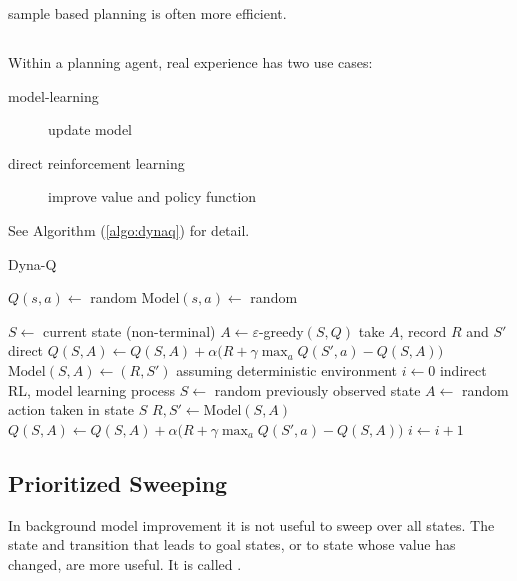 sample based planning is often more efficient.



\subsection{}

Within a planning agent, real experience has two use cases:

\begin{description}
	\item [model-learning] update model
	\item [direct reinforcement learning] improve value and policy function
\end{description}




See Algorithm (\ref{algo:dynaq}) for detail.


\begin{algorithm}
	\caption{Dyna-Q}\label{algo:dynaq}	
	
	\begin{algorithmic}[1]
		\State $Q(s,a) \gets$ random
		\State $\text{Model}(s,a) \gets$ random
		
		\Statex
		
		\Loop
			\State $S \gets$ current state (non-terminal)
			\State $A \gets \varepsilon$-greedy$(S,Q)$
			\State take $A$, record $R$ and $S\prime$
			\State \Comment direct 
			\State $Q(S,A) \gets Q(S,A) + \alpha \Big (R + \gamma \max_a Q(S',a) - Q(S,A ) \Big)$ 
			\State $\text{Model}(S,A) \gets (R,S')$ \Comment assuming deterministic environment
			\State $i \gets 0$
			\Repeat \Comment indirect RL, model learning process
				\State $S \gets $ random previously observed state
				\State $A \gets $ random action taken in state $S$
				\State $R,S' \gets \text{Model}(S,A)$
				\State $Q(S,A) \gets Q(S,A) + \alpha \Big(R + \gamma \max_a Q(S',a) - Q(S,A ) \Big) $
				\State $ i \gets i + 1$
		\EndLoop
	\end{algorithmic}
\end{algorithm}

\subsection{Prioritized Sweeping}

In background model improvement it is not useful to sweep over all states. The state and transition that leads to goal states, or to state whose value has changed, are more useful. It is called . 


